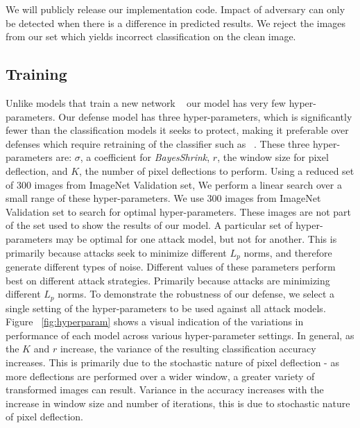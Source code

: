 We will publicly release  our implementation code.
Impact of adversary can only be detected when there is a difference in predicted results.
We reject the images from our set which yields incorrect classification on the clean image. 

\subsection{Training}

Unlike models that train a new network  ~\cite{Tramr2017TheSO,Meng2017MagNetAT} our model has very few hyper-parameters.
Our defense model has three hyper-parameters, which is significantly fewer than the classification models it seeks to protect, making it preferable over defenses which require retraining of the classifier such as  ~\cite{Tramr2017TheSO,Meng2017MagNetAT}.
These three hyper-parameters are: $\sigma$, a coefficient for \textit{BayesShrink}, $r$, the window size for pixel deflection, and $K$, the number of pixel deflections to perform.
Using a reduced set of $300$ images from ImageNet Validation set, We perform a linear search over a small range of these hyper-parameters. 
We use $300$ images from ImageNet Validation set to search for optimal hyper-parameters. 
These images are not part of the set used to show the results of our model.
A particular set of hyper-parameters may be optimal for one attack model, but not for another.  
This is primarily because attacks seek to minimize different $L_p$ norms, and therefore generate different types of noise.
Different values of these parameters perform best on different attack strategies. 
Primarily because attacks are minimizing different $L_p$ norms. 
To demonstrate the robustness of our defense, we select a single setting of the hyper-parameters to be used against all attack models.
Figure ~\ref{fig:hyperparam} shows a visual indication of the variations in performance of each model across various hyper-parameter settings. 
In general, as the $K$ and $r$ increase, the variance of the resulting classification accuracy increases.  
This is primarily due to the stochastic nature of pixel deflection - as more deflections are performed over a wider window, a greater variety of transformed images can result.
Variance in the accuracy increases with the increase in window size and number of iterations, this is due to stochastic nature of pixel deflection.

